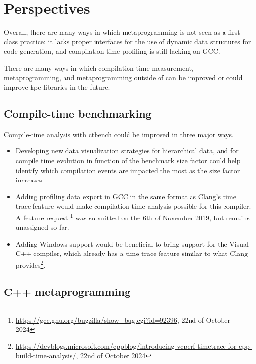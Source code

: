 \documentclass[main]{subfiles}
\begin{document}
\section*{Perspectives}

Overall, there are many ways in which \cpp metaprogramming is not seen as
a first class practice: it lacks proper interfaces for the use of dynamic
data structures for code generation, and compilation time profiling is still
lacking on GCC.

There are many ways in which compilation time measurement, \cpp metaprogramming,
and metaprogramming outside of \cpp can be improved or could improve \gls{hpc}
libraries in the future.

\subsection*{Compile-time benchmarking}

Compile-time analysis with ctbench could be improved in three major ways.

\begin{itemize}

\item Developing new data visualization strategies for hierarchical
data, and for compile time evolution in function of the benchmark size factor
could help identify which compilation events are impacted the most
as the size factor increases.

\item Adding profiling data export in GCC in the same format as Clang's
time trace feature would make compilation time analysis possible for this
compiler.
A feature request \footnote{
\url{https://gcc.gnu.org/bugzilla/show_bug.cgi?id=92396}, 22nd of October 2024}
was submitted on the 6th of November 2019, but remains unassigned so far.

\item Adding Windows support would be beneficial to bring support for the
Visual C++ compiler, which already has a time trace feature similar to
what Clang provides\footnote{\tiny{}\url{https://devblogs.microsoft.com/cppblog/introducing-vcperf-timetrace-for-cpp-build-time-analysis/},
\footnotesize{}22nd of October 2024}.

\end{itemize}

\subsection*{C++ metaprogramming}
\end{document}
